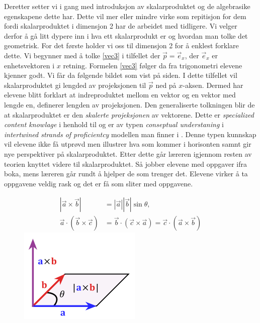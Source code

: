 \documentclass[11pt]{article}
\begin{document}
Deretter setter vi i gang med introduksjon av skalarproduktet og de algebrasike egenskapene dette har. Dette vil mer eller mindre virke som repitisjon for dem fordi skalarproduktet i dimensjon 2 har de arbeidet med tidligere. Vi velger derfor å gå litt dypere inn i hva ett skalarprodukt er og hvordan man tolke det geometrisk.  
For det første holder vi oss til dimensjon 2 for å enklest forklare dette. Vi begynner med å tolke \eqref{vec3} i tilfellet der $\vec{p} = \vec{e}_x$, der $\vec{e}_x$ er enhetsvektoren i $x$ retning.  Formelen \eqref{vec3} følger da fra trigonometri elevene kjenner godt.
Vi får da følgende bildet som vist på siden. I dette tilfellet vil skalarproduktet gi lengded av projeksjonen til $\vec{p}$ ned på $x$-aksen. Dermed har elevene blitt forklart at indreproduktet mellom en vektor og en vektor med lengde en, definerer lengden av projeksjonen. Den generaliserte tolkningen blir de at skalarproduktet er den \emph{skalerte projeksjonen} av vektorene.
Dette er \emph{specialized content knowlage} i henhold til \citep{Ball} og er av typen \emph{conseptual understaning} i \emph{intertwined strands of proficientcy} modellen man finner i \citep{addup}. Denne typen kunnskap vil elevene ikke få utprøvd men illustrer hva som kommer i horisonten samnt gir nye perspektiver på skalarproduktet. Etter dette går læreren igjennom resten av teorien knyttet videre til skalarproduktet. Så jobber elevene med oppgaver ifra boka, mens læreren går rundt å hjelper de som trenger det. Elevene virker å ta oppgavene veldig rask og det er få som sliter med oppgavene.\\
\begin{figure}
  \begin{center}
  \begin{align}
|\vec{a}\times \vec{b}|  & = |\vec{a}||\vec{b}| \sin{\theta},\\
\vec{a}\cdot (\vec{b}\times \vec{c}) & = \vec{b} \cdot(\vec{c} \times \vec{a})  = \vec{c}\cdot(\vec{a}\times \vec{b})
  \end{align}
  \includegraphics[scale = 0.4]{./img/cross.png}
    \end{center}
\end{figure}
\end{document}
